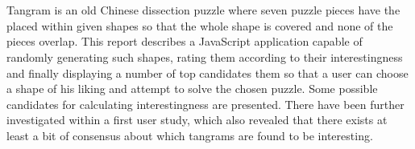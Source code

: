 \chapter*{\abstractname}

Tangram is an old Chinese dissection puzzle where seven puzzle pieces have the placed within given shapes so that the whole shape is covered and none of the pieces overlap. This report describes a JavaScript application capable of randomly generating such shapes, rating them according to their interestingness and finally displaying a number of top candidates them so that a user can choose a shape of his liking and attempt to solve the chosen puzzle. Some possible candidates for calculating interestingness are presented. There have been further investigated within a first user study, which also revealed that there exists at least a bit of consensus about which tangrams are found to be interesting. 